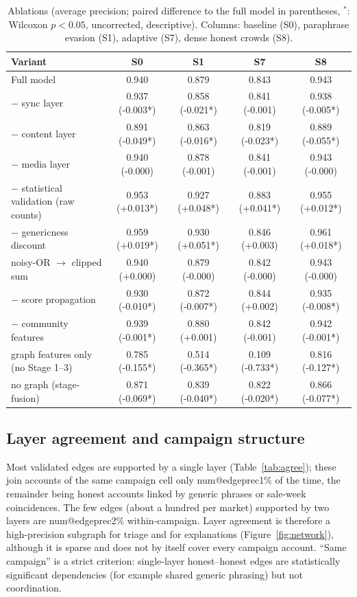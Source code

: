 \documentclass[pdflatex,sn-basic]{sn-jnl}
\makeatletter
\theoremstyle{thmstyleone}
\theoremstyle{thmstylethree}
\newcommand{\num}[1]{\csname num@#1\endcsname}
\makeatother
\begin{document}
\begin{table}[t]
\caption{Ablations (average precision; paired difference to the full model in parentheses, $^{*}$: Wilcoxon $p<0.05$, uncorrected, descriptive). Columns: baseline (S0), paraphrase evasion (S1), adaptive (S7), dense honest crowds (S8).}\label{tab:abl}
\footnotesize\setlength{\tabcolsep}{2pt}
\begin{tabular}{@{}lcccc@{}}
\toprule
Variant & S0 & S1 & S7 & S8 \\
\midrule
Full model & 0.940 & 0.879 & 0.843 & 0.943 \\
$-$ sync layer & 0.937 (-0.003*) & 0.858 (-0.021*) & 0.841 (-0.001) & 0.938 (-0.005*) \\
$-$ content layer & 0.891 (-0.049*) & 0.863 (-0.016*) & 0.819 (-0.023*) & 0.889 (-0.055*) \\
$-$ media layer & 0.940 (-0.000) & 0.878 (-0.001) & 0.841 (-0.001) & 0.943 (-0.000) \\
$-$ statistical validation (raw counts) & 0.953 (+0.013*) & 0.927 (+0.048*) & 0.883 (+0.041*) & 0.955 (+0.012*) \\
$-$ genericness discount & 0.959 (+0.019*) & 0.930 (+0.051*) & 0.846 (+0.003) & 0.961 (+0.018*) \\
noisy-OR $\to$ clipped sum & 0.940 (+0.000) & 0.879 (-0.000) & 0.842 (-0.000) & 0.943 (-0.000) \\
$-$ score propagation & 0.930 (-0.010*) & 0.872 (-0.007*) & 0.844 (+0.002) & 0.935 (-0.008*) \\
$-$ community features & 0.939 (-0.001*) & 0.880 (+0.001) & 0.842 (-0.001) & 0.942 (-0.001*) \\
graph features only (no Stage 1--3) & 0.785 (-0.155*) & 0.514 (-0.365*) & 0.109 (-0.733*) & 0.816 (-0.127*) \\
no graph (stage-fusion) & 0.871 (-0.069*) & 0.839 (-0.040*) & 0.822 (-0.020*) & 0.866 (-0.077*) \\
\bottomrule
\end{tabular}
\end{table}

\subsection{Layer agreement and campaign structure}\label{sec:res_agree}
Most validated edges are supported by a single layer (Table~\ref{tab:agree}); these join accounts of the same campaign cell only \num{edgeprec1}\% of the time, the remainder being honest accounts linked by generic phrases or sale-week coincidences. The few edges (about a hundred per market) supported by two layers are \num{edgeprec2}\% within-campaign. Layer agreement is therefore a high-precision subgraph for triage and for explanations (Figure~\ref{fig:network}), although it is sparse and does not by itself cover every campaign account. ``Same campaign'' is a strict criterion: single-layer honest--honest edges are statistically significant dependencies (for example shared generic phrasing) but not coordination.
\end{document}
